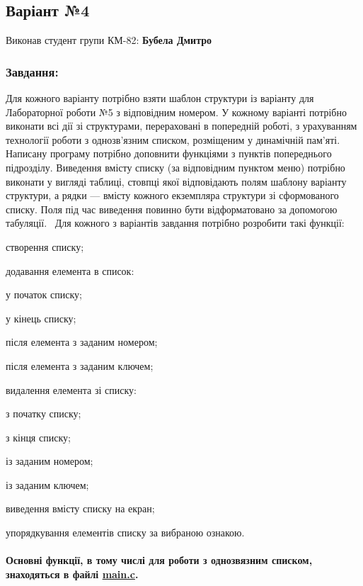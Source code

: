 \begin{center} \subsection*{Варіант №4}\end{center} 

\begin{center} \end{center}  Виконав студент групи КМ-\/82\+: {\bfseries Бубела Дмитро}~\newline
 \subsubsection*{Завдання\+:}

Для кожного варіанту потрібно взяти шаблон структури із варіанту для Лабораторної роботи №5 з відповідним номером. У кожному варіанті потрібно виконати всі дії зі структурами, перераховані в попередній роботі, з урахуванням технології роботи з однозв’язним списком, розміщеним у динамічній пам’яті. Написану програму потрібно доповнити функціями з пунктів попереднього підрозділу. Виведення вмісту списку (за відповідним пунктом меню) потрібно виконати у вигляді таблиці, стовпці якої відповідають полям шаблону варіанту структури, а рядки — вмісту кожного екземпляра структури зі сформованого списку. Поля під час виведення повинно бути відформатовано за допомогою табуляції.~\newline
Для кожного з варіантів завдання потрібно розробити такі функції\+:~\newline

\begin{DoxyItemize}
\item створення списку;
\item додавання елемента в список\+:
\begin{DoxyEnumerate}
\item у початок списку;
\item у кінець списку;
\item після елемента з заданим номером;
\item після елемента з заданим ключем;
\end{DoxyEnumerate}
\item видалення елемента зі списку\+:
\begin{DoxyEnumerate}
\item з початку списку;
\item з кінця списку;
\item із заданим номером;
\item із заданим ключем;
\end{DoxyEnumerate}
\item виведення вмісту списку на екран;
\item упорядкування елементів списку за вибраною ознакою.~\newline
\paragraph*{Основні функції, в тому числі для роботи з однозв\textquotesingle{}язним списком, знаходяться в файлі \hyperlink{main_8c}{main.\+c}.}
\end{DoxyItemize}

